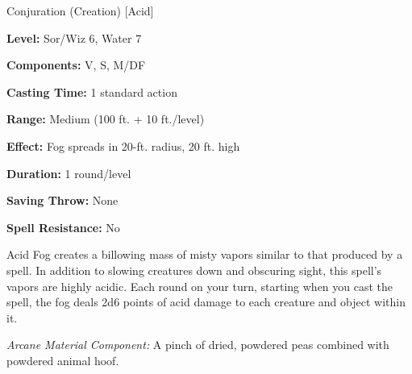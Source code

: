 
Conjuration (Creation) [Acid]

\textbf{Level:} Sor/Wiz 6, Water 7

\textbf{Components:} V, S, M/DF

\textbf{Casting Time:} 1 standard action

\textbf{Range:} Medium (100 ft. + 10 ft./level)

\textbf{Effect:} Fog spreads in 20-ft. radius, 20 ft. high

\textbf{Duration:} 1 round/level

\textbf{Saving Throw:} None

\textbf{Spell Resistance:} No

Acid Fog creates a billowing mass of misty vapors similar to that produced 
by a  spell. In addition to slowing creatures down and obscuring 
sight, this spell's vapors are highly acidic. Each round on your turn, starting 
when you cast the spell, the fog deals 2d6 points of acid damage to each creature 
and object within it.

\textit{Arcane Material Component:} A pinch of dried, powdered peas combined with 
powdered animal hoof.

